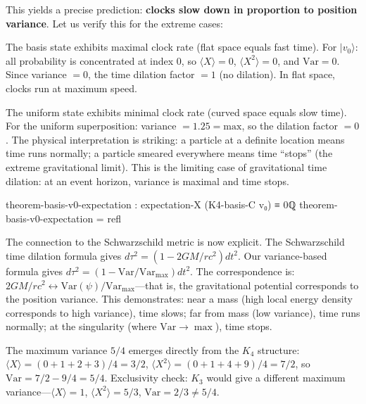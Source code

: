 \documentclass[11pt,a4paper]{book}
\begin{document}
This yields a precise prediction: \textbf{clocks slow down in proportion to 
position variance}. Let us verify this for the extreme cases:

The basis state exhibits maximal clock rate (flat space equals fast time). For $|v_0\rangle$: all probability is concentrated at index 0, so $\langle X\rangle = 0$, $\langle X^2\rangle = 0$, and $\text{Var} = 0$. Since variance $= 0$, the time dilation factor $= 1$ (no dilation). In flat space, clocks run at maximum speed.

The uniform state exhibits minimal clock rate (curved space equals slow time). For the uniform superposition: variance $= 1.25 = \text{max}$, so the dilation factor $= 0$. The physical interpretation is striking: a particle at a definite location means time runs normally; a particle smeared everywhere means time ``stops'' (the extreme gravitational limit). This is the limiting case of gravitational time dilation: at an event horizon, variance is maximal and time stops.

\begin{code}
theorem-basis-v0-expectation : expectation-X (K4-basis-C v₀) ≡ 0ℚ
theorem-basis-v0-expectation = refl
\end{code}

The connection to the Schwarzschild metric is now explicit. The Schwarzschild time dilation formula gives $d\tau^2 = (1 - 2GM/rc^2) dt^2$. Our variance-based formula gives $d\tau^2 = (1 - \text{Var}/\text{Var}_{\max}) dt^2$. The correspondence is: $2GM/rc^2 \leftrightarrow \text{Var}(\psi)/\text{Var}_{\max}$---that is, the gravitational potential corresponds to the position variance. This demonstrates: near a mass (high local energy density corresponds to high variance), time slows; far from mass (low variance), time runs normally; at the singularity (where $\text{Var} \to \max$), time stops.

The maximum variance $5/4$ emerges directly from the $K_4$ structure: $\langle X\rangle = (0+1+2+3)/4 = 3/2$, $\langle X^2\rangle = (0+1+4+9)/4 = 7/2$, so $\text{Var} = 7/2 - 9/4 = 5/4$. Exclusivity check: $K_3$ would give a different maximum variance---$\langle X\rangle = 1$, $\langle X^2\rangle = 5/3$, $\text{Var} = 2/3 \neq 5/4$.
\end{document}
